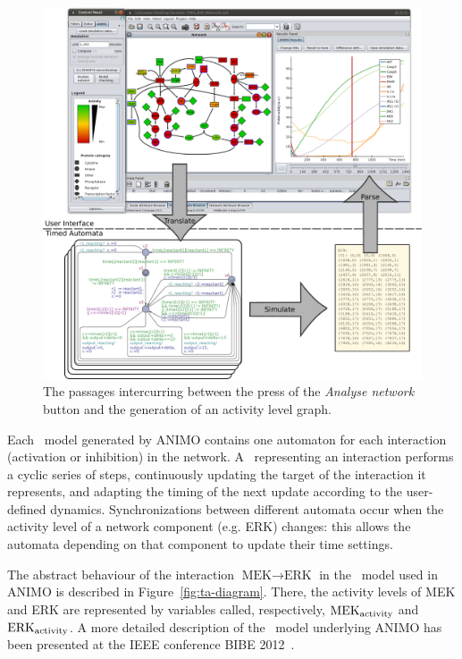 \begin{figure}[htb]
\begin{minipage}{\textwidth}
  \includegraphics[width=\textwidth]{images/animo_simulation_workflow}
\caption{The passages intercurring between the press of the \emph{Analyse network} button
and the generation of an activity level graph.}\label{fig:animo-sim-workflow}
\end{minipage}
\end{figure}

Each \tas\ model generated by ANIMO contains one automaton for each interaction (activation or inhibition) in the network.
A \ta\ representing an interaction performs a cyclic series of steps, continuously updating
the target of the interaction it represents, and adapting the timing of the next update according to
the user-defined dynamics. Synchronizations between different automata occur when the activity level of a network component (e.g. ERK)
changes: this allows the automata depending on that component to update their time settings.

The abstract behaviour of the interaction $\mbox{MEK} \rightarrow \mbox{ERK}$ in the \tas\ model used in ANIMO is described in Figure~\ref{fig:ta-diagram}.
There, the activity levels of MEK and ERK are represented by variables called, respectively, $\mbox{MEK}_{\mbox{\scriptsize activity}}$
and $\mbox{ERK}_{\mbox{\scriptsize activity}}$. A more detailed description of the \tas\ model underlying ANIMO has been presented
at the IEEE conference BIBE 2012~\citep{animo-bibe}.

